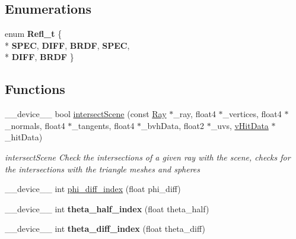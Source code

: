 \subsection*{Enumerations}
\begin{DoxyCompactItemize}
\item 
enum {\bfseries Refl\-\_\-t} \{ \\*
{\bfseries S\-P\-E\-C}, 
{\bfseries D\-I\-F\-F}, 
{\bfseries B\-R\-D\-F}, 
{\bfseries S\-P\-E\-C}, 
\\*
{\bfseries D\-I\-F\-F}, 
{\bfseries B\-R\-D\-F}
 \}
\end{DoxyCompactItemize}
\subsection*{Functions}
\begin{DoxyCompactItemize}
\item 
\-\_\-\-\_\-device\-\_\-\-\_\- bool \hyperlink{PathTracer_8cu_a3a7d49a03827792a75682fe15f4277c0}{intersect\-Scene} (const \hyperlink{structRay}{Ray} $\ast$\-\_\-ray, float4 $\ast$\-\_\-vertices, float4 $\ast$\-\_\-normals, float4 $\ast$\-\_\-tangents, float4 $\ast$\-\_\-bvh\-Data, float2 $\ast$\-\_\-uvs, \hyperlink{structvHitData}{v\-Hit\-Data} $\ast$\-\_\-hit\-Data)
\begin{DoxyCompactList}\small\item\em intersect\-Scene Check the intersections of a given ray with the scene, checks for the intersections with the triangle meshes and spheres \end{DoxyCompactList}\item 
\-\_\-\-\_\-device\-\_\-\-\_\- int \hyperlink{PathTracer_8cu_af8a748763d0b1381610d17db7e629f11}{phi\-\_\-diff\-\_\-index} (float phi\-\_\-diff)
\item 
\hypertarget{PathTracer_8cu_ab0b08863f3853b7448c3483d37dd7a9a}{\-\_\-\-\_\-device\-\_\-\-\_\- int {\bfseries theta\-\_\-half\-\_\-index} (float theta\-\_\-half)}\label{PathTracer_8cu_ab0b08863f3853b7448c3483d37dd7a9a}

\item 
\hypertarget{PathTracer_8cu_a55d9710cfc505aad07005204ede4eb44}{\-\_\-\-\_\-device\-\_\-\-\_\- int {\bfseries theta\-\_\-diff\-\_\-index} (float theta\-\_\-diff)}\label{PathTracer_8cu_a55d9710cfc505aad07005204ede4eb44}


\end{DoxyCompactItemize}
